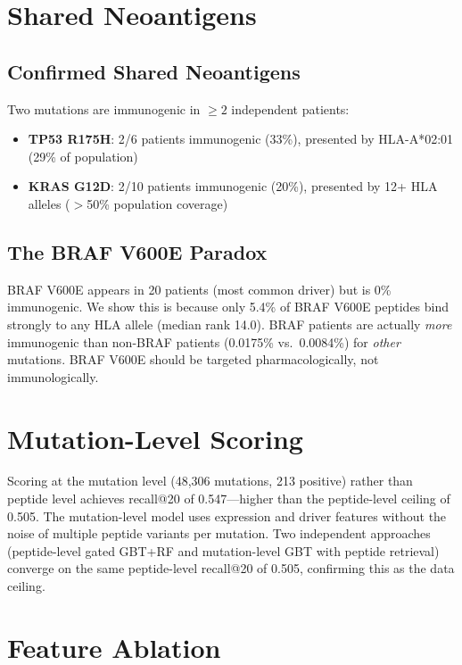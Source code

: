 \documentclass[11pt,twocolumn]{article}
\begin{document}
\section{Shared Neoantigens}

\subsection{Confirmed Shared Neoantigens}

Two mutations are immunogenic in $\geq 2$ independent patients:
\begin{itemize}[nosep]
\item \textbf{TP53 R175H}: 2/6 patients immunogenic (33\%), presented by
HLA-A*02:01 (29\% of population)
\item \textbf{KRAS G12D}: 2/10 patients immunogenic (20\%), presented by
12+ HLA alleles ($>$50\% population coverage)
\end{itemize}

\subsection{The BRAF V600E Paradox}

BRAF V600E appears in 20 patients (most common driver) but is 0\%
immunogenic. We show this is because only 5.4\% of BRAF V600E peptides
bind strongly to any HLA allele (median rank 14.0). BRAF patients are
actually \textit{more} immunogenic than non-BRAF patients (0.0175\% vs.\
0.0084\%) for \textit{other} mutations. BRAF V600E should be targeted
pharmacologically, not immunologically.

\section{Mutation-Level Scoring}

Scoring at the mutation level (48,306 mutations, 213 positive) rather
than peptide level achieves recall@20 of 0.547---higher than the
peptide-level ceiling of 0.505. The mutation-level model uses expression
and driver features without the noise of multiple peptide variants per
mutation. Two independent approaches (peptide-level gated GBT+RF and
mutation-level GBT with peptide retrieval) converge on the same
peptide-level recall@20 of 0.505, confirming this as the data ceiling.

\section{Feature Ablation}
\end{document}
